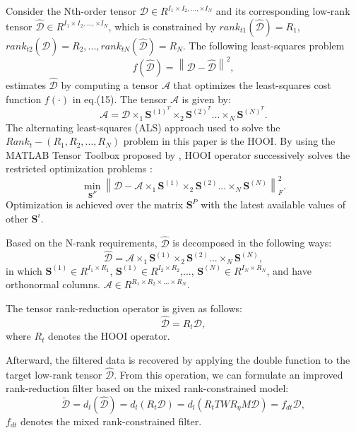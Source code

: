 Consider the Nth-order tensor $\mathcal{D}\in R^{I_1 \times I_2,...,\times I_N}$ and its corresponding low-rank tensor $\mathcal{\hat D} \in R^{I_1 \times I_2,...,\times I_N}$, which is constrained by 
$rank_{t1}(\mathcal{\hat D})= R_1$, $rank_{t2}(\mathcal{\hat D})= R_2,...,rank_{tN}(\mathcal{\hat D})=R_N$. The following least-squares problem
\begin{equation}
f(\mathcal{\hat D})=\left\|\mathcal{D}-\mathcal{\hat D}\right\|^2, 
\end{equation}
estimates $ \mathcal{\hat D} $ by computing a tensor $\mathcal{A}$ that optimizes the least-squares cost function $f(\mathcal{\cdot})$ in eq.(15). The tensor $\mathcal{A}$ is given by:
\begin{equation}
\mathcal{A}=\mathcal{D}\times_1\mathbf{S}^{(1)^{T}}\times_2\mathbf{S}^{(2)^{T}}...\times_N\mathbf{S}^{(N)^{T}}.
\end{equation}
The alternating least-squares (ALS) approach used to solve the $ Rank_t-({R_1,R_2,...,R_N}) $ problem in this paper is the HOOI. By using the MATLAB Tensor Toolbox proposed by \cite{bader2010matlab}, HOOI operator successively solves the restricted optimization problems \citep{sheehan2007higher}:
\begin{equation}
\min_{\mathbf{S}^P}\left\|\mathcal{D} - \mathcal{A} \times_1\mathbf{S}^{(1)}\times_2\mathbf{S}^{(2)}...\times_N\mathbf{S}^{(N)} \right\|_F^2.
\end{equation}
Optimization is achieved over the matrix $\mathbf{S}^P$ with the latest available values of other $\mathbf{S}^i$.

Based on the N-rank requirements, $\mathcal{\hat D}$ is decomposed in the following ways:
\begin{equation}
\mathcal{\hat{D}}=\mathcal{A}\times_1\mathbf{S}^{(1)}\times_2\mathbf{S}^{(2)}...\times_N\mathbf{S}^{(N)},
\end{equation}
in which $ \mathbf{S}^{(1)} \in R^{I_1 \times R_1} $, $ \mathbf{S}^{(1)} \in R^{I_2 \times R_2}$,..., $ \mathbf{S}^{(N)} \in R^{I_N \times R_N}$, and have orthonormal columns.  $ \mathcal{A} \in R^{R_1\times R_2 \times...\times R_N}$. 

The tensor rank-reduction operator is given as follows:
\begin{equation}
\mathcal{\hat D} = {R_t}{\mathcal{D}}, 
\end{equation}
where ${R_t}$ denotes the HOOI operator. 

Afterward, the filtered data is recovered by applying the double function to the target low-rank tensor $\mathcal{\hat D}$. 
From this operation, we can formulate an improved rank-reduction filter based on the mixed rank-constrained model:
\begin{equation}
\mathcal{\breve{D}}= d_l\left(\mathcal{\hat D}\right)=d_l\left( {R_t}{\mathcal{D}}\right)=d_l\left({R_t}T{W}{R_\eta}{M}\mathcal{D}\right)=f_{dt}\mathcal{D},
\end{equation}
 $f_{dt}$ denotes the mixed rank-constrained filter. 

